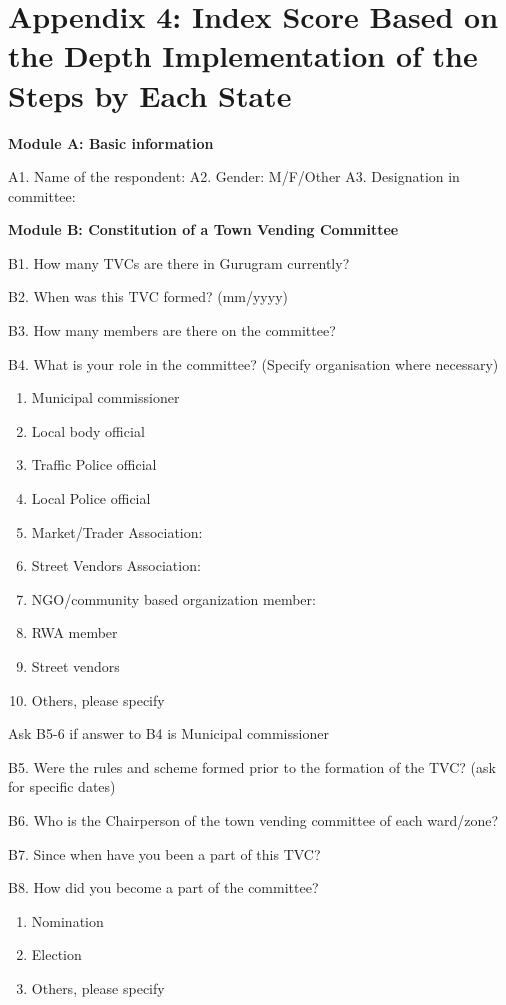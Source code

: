\documentclass[a4paper, 12pt, twoside]{article}
\begin{document}
{{%
\section*{Appendix 4: Index Score Based on the Depth Implementation of the Steps by Each State}

\textbf{Module A: Basic information}

A1. Name of the respondent:
A2. Gender: M/F/Other
A3. Designation in committee:

\textbf{Module B: Constitution of a Town Vending Committee}

B1. How many TVCs are there in Gurugram currently?

B2. When was this TVC formed? (mm/yyyy)

B3. How many members are there on the committee?

B4. What is your role in the committee? (Specify organisation where necessary)

\begin{enumerate}
\item Municipal commissioner
\item Local body official
\item Traffic Police official
\item Local Police official
\item Market/Trader Association:
\item Street Vendors Association:
\item NGO/community based organization member:
\item RWA member
\item Street vendors
\item Others, please specify
\end{enumerate}

Ask B5-6 if answer to B4 is Municipal commissioner

B5. Were the rules and scheme formed prior to the formation of the TVC? (ask for specific dates)

B6. Who is the Chairperson of the town vending committee of each ward/zone?

B7. Since when have you been a part of this TVC?

B8. How did you become a part of the committee?
\begin{enumerate}
\item Nomination
\item Election
\item Others, please specify
\end{enumerate}

}}
\end{document}

